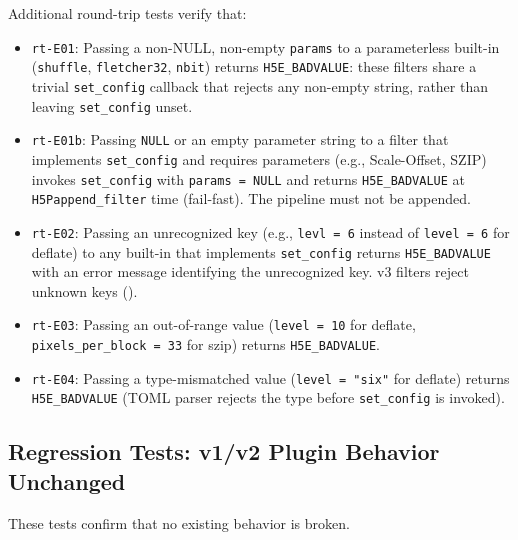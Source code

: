 \documentclass[../RFC-HDFG-2026-001.tex]{subfiles}
\begin{document}
\noindent Additional round-trip tests verify that:
\begin{itemize}
\item \texttt{rt-E01}: Passing a non-NULL, non-empty \texttt{params} to a parameterless
  built-in (\texttt{shuffle}, \texttt{fletcher32}, \texttt{nbit}) returns
  \texttt{H5E\_BADVALUE}: these filters share a trivial \texttt{set\_config}
  callback that rejects any non-empty string, rather than leaving
  \texttt{set\_config} unset.
\item \texttt{rt-E01b}: Passing \texttt{NULL} or an empty parameter string
  to a filter that implements \texttt{set\_config} and requires parameters
  (e.g., Scale-Offset, SZIP) invokes \texttt{set\_config} with
  \texttt{params~=~NULL} and returns \texttt{H5E\_BADVALUE} at
  \texttt{H5Pappend\_filter} time (fail-fast). The pipeline must not be
  appended.
\item \texttt{rt-E02}: Passing an unrecognized key (e.g., \texttt{levl = 6}
  instead of \texttt{level = 6} for deflate) to any built-in that implements
  \texttt{set\_config} returns \texttt{H5E\_BADVALUE} with an error message
  identifying the unrecognized key. v3 filters reject unknown keys
  ().
\item \texttt{rt-E03}: Passing an out-of-range value (\texttt{level = 10} for deflate,
  \texttt{pixels\_per\_block = 33} for szip) returns \texttt{H5E\_BADVALUE}.
\item \texttt{rt-E04}: Passing a type-mismatched value (\texttt{level = "six"} for deflate)
  returns \texttt{H5E\_BADVALUE} (TOML parser rejects the type before \texttt{set\_config}
  is invoked).
\end{itemize}


\subsection{Regression Tests: v1/v2 Plugin Behavior Unchanged}
\label{sec:test-regression}

These tests confirm that no existing behavior is broken.
\end{document}
